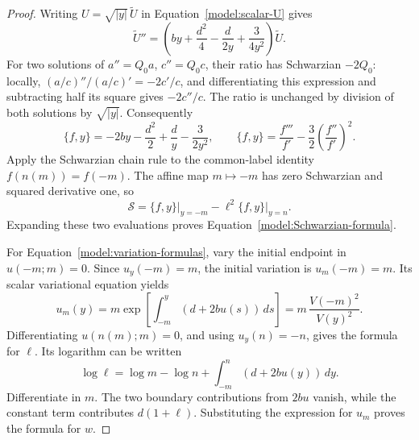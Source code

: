\begin{proof}
Writing \(U=\sqrt{|y|}\,\widetilde U\) in
Equation~\eqref{model:scalar-U} gives
\[
 \widetilde U''
 =\left(by+\frac{d^2}{4}-\frac{d}{2y}
                    +\frac3{4y^2}\right)\widetilde U.
\]
For two solutions of \(a''=Q_0a\), \(c''=Q_0c\), their ratio has
Schwarzian \(-2Q_0\): locally,
\((a/c)''/(a/c)'=-2c'/c\), and differentiating this expression and
subtracting half its square gives \(-2c''/c\).
The ratio is unchanged by division of both solutions by
\(\sqrt{|y|}\).  Consequently
\[
 \{f,y\}=-2by-\frac{d^2}{2}+\frac d y-\frac3{2y^2},
 \qquad
 \{f,y\}=\frac{f'''}{f'}-\frac32\left(\frac{f''}{f'}\right)^2.
\]
Apply the Schwarzian chain rule to the common-label identity
\(f(n(m))=f(-m)\).  The affine map \(m\mapsto-m\) has zero
Schwarzian and squared derivative one, so
\[
 \mathcal S=\{f,y\}\big|_{y=-m}
              -\ell^2\{f,y\}\big|_{y=n}.
\]
Expanding these two evaluations proves
Equation~\eqref{model:Schwarzian-formula}.

For Equation~\eqref{model:variation-formulas}, vary the initial endpoint
in \(u(-m;m)=0\).  Since \(u_y(-m)=m\), the initial variation is
\(u_m(-m)=m\).  Its scalar variational equation yields
\[
 u_m(y)=m\exp\left[\int_{-m}^{y}(d+2bu(s))\,ds\right]
       =m\,\frac{V(-m)^2}{V(y)^2}.
\]
Differentiating \(u(n(m);m)=0\), and using \(u_y(n)=-n\), gives the
formula for \(\ell\).  Its logarithm can be written
\[
 \log\ell=\log m-\log n+\int_{-m}^{n}(d+2bu(y))\,dy.
\]
Differentiate in \(m\).  The two boundary contributions from \(2bu\)
vanish, while the constant term contributes \(d(1+\ell)\).
Substituting the expression for \(u_m\) proves the formula for \(w\).


\end{proof}
